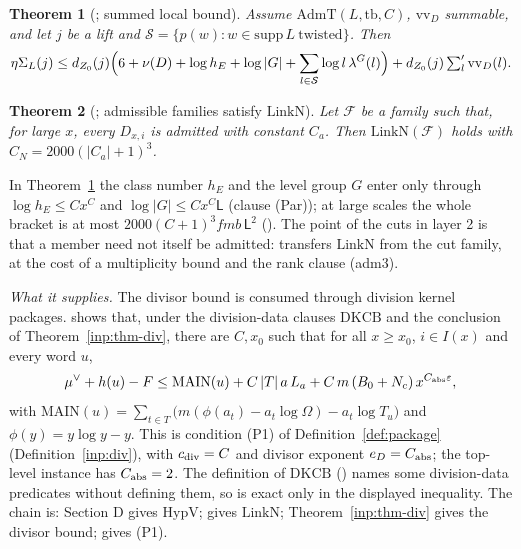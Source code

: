 \documentclass[10pt]{amsart}
\newtheorem{theorem}{Theorem}[section]
\theoremstyle{definition}
\theoremstyle{remark}
\begin{document}
\begin{theorem}[{\cite[Theorem~\ref{A-i2:thm-summed}]{Annex}}; summed local bound]\label{inp:thm-summed}
Assume $\mathrm{AdmT}(L,\mathrm{tb},C)$, $\mathrm{vv}_D$ summable, and let $j$ be a lift and
$\mathcal S=\{p(w):w\in\mathrm{supp}\,L\ \text{twisted}\}$. Then
\[
\eta\Sigma_L(j)\le d_{Z_0}(j)\Bigl(6+\nu(D)+\log h_E+\log|G|+\sum_{l\in\mathcal S}\log l\,\lambda^G(l)\Bigr)+d_{Z_0}(j)\textstyle\sum'_l\mathrm{vv}_D(l).
\]
\end{theorem}

\begin{theorem}[{\cite[Theorem~\ref{A-i2:thm-export}]{Annex}}; admissible families satisfy $\mathrm{LinkN}$]\label{inp:thm-export}
Let $\mathcal F$ be a family such that, for large $x$, every $D_{x,i}$ is admitted with constant
$C_a$. Then $\mathrm{LinkN}(\mathcal F)$ holds with $C_N=2000(|C_a|+1)^3$.
\end{theorem}

\noindent In Theorem~\ref{inp:thm-summed} the class number $h_E$ and the
level group $G$ enter only through $\log h_E\le Cx^C$ and
$\log|G|\le Cx^C\mathsf L$ (clause (Par)); at large scales the whole
bracket is at most $2000(C+1)^3fmb\,\mathsf L^2$
(\cite[Proposition~\ref{A-i2:prop-point}]{Annex}). The point of the cuts in layer 2 is that a
member need not itself be admitted: \cite[Theorem~\ref{A-i2:thm-transfer}]{Annex}
transfers $\mathrm{LinkN}$ from the cut family, at the cost of a
multiplicity bound and the rank clause (adm3).

\emph{What it supplies.} The divisor bound is consumed through division
kernel packages. \cite[Proposition~\ref{A-i2:prop-P1}]{Annex} shows that,
under the division-data clauses $\mathrm{DKCB}$ and the conclusion of
Theorem~\ref{inp:thm-div}, there are $C,x_0$ such that for all $x\ge x_0$,
$i\in I(x)$ and every word $u$,
\[
\mu^\vee+h(u)-F\le\mathrm{MAIN}(u)+C\,|T|\,a\,L_a+C\,m\,(B_0+N_c)\,x^{C_{\rm abs}\varepsilon},
\]
with $\mathrm{MAIN}(u)=\sum_{t\in T}\bigl(m(\phi(a_t)-a_t\log\Omega)-a_t\log T_u\bigr)$
and $\phi(y)=y\log y-y$. This is condition (P1) of
Definition~\ref{def:package} (Definition~\ref{inp:div}), with
$c_{\rm div}=C$ and divisor exponent $e_D=C_{\rm abs}$; the top-level
instance has $C_{\rm abs}=2$. The definition of $\mathrm{DKCB}$
(\cite[Definition~\ref{A-i2:def-DKCB}]{Annex}) names some division-data
predicates without defining them, so
\cite[Proposition~\ref{A-i2:prop-P1}]{Annex} is exact only in the displayed
inequality. The chain is: Section D gives $\mathrm{HypV}$;
\cite[Theorem~\ref{A-i2:thm-linkN}]{Annex} gives $\mathrm{LinkN}$;
Theorem~\ref{inp:thm-div} gives the divisor bound;
\cite[Proposition~\ref{A-i2:prop-P1}]{Annex} gives (P1).
\end{document}
